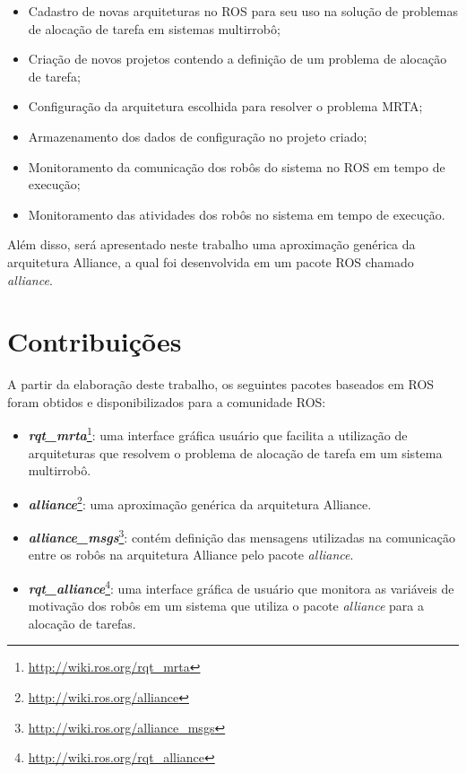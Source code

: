         \begin{itemize}
            \item Cadastro de novas arquiteturas no ROS para seu uso na solução de problemas de alocação de tarefa em sistemas multirrobô;
            \item Criação de novos projetos contendo a definição de um problema de alocação de tarefa;
            \item Configuração da arquitetura escolhida para resolver o problema MRTA;
            \item Armazenamento dos dados de configuração no projeto criado;
            \item Monitoramento da comunicação dos robôs do sistema no ROS em tempo de execução;
            \item Monitoramento das atividades dos robôs no sistema em tempo de execução.
        \end{itemize}
        
        Além disso, será apresentado neste trabalho uma aproximação genérica da arquitetura Alliance, a qual foi desenvolvida em um pacote ROS chamado \textit{alliance}.
        
    \section{Contribuições} \label{sec:contribuicoes}
        A partir da elaboração deste trabalho, os seguintes pacotes baseados em ROS foram obtidos e disponibilizados para a comunidade ROS:
        
        \begin{itemize}
            \item \textbf{\textit{rqt\_mrta}}\footnote{\url{http://wiki.ros.org/rqt_mrta}}: uma interface gráfica usuário que facilita a utilização de arquiteturas que resolvem o problema de alocação de tarefa em um sistema multirrobô.
            \item \textbf{\textit{alliance}}\footnote{\url{http://wiki.ros.org/alliance}}: uma aproximação genérica da arquitetura Alliance.
            \item \textbf{\textit{alliance\_msgs}}\footnote{\url{http://wiki.ros.org/alliance_msgs}}: contém definição das mensagens utilizadas na comunicação entre os robôs na arquitetura Alliance pelo pacote \textit{alliance}.
            \item \textbf{\textit{rqt\_alliance}}\footnote{\url{http://wiki.ros.org/rqt_alliance}}: uma interface gráfica de usuário que monitora as variáveis de motivação dos robôs em um sistema que utiliza o pacote \textit{alliance} para a alocação de tarefas.
        \end{itemize}
    
